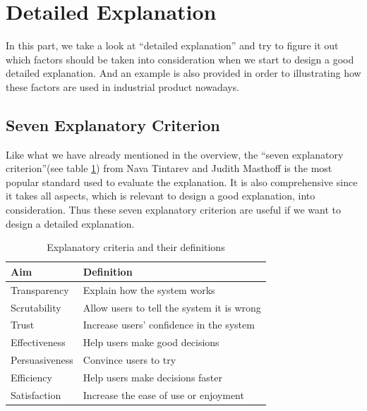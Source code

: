 \section{Detailed Explanation}
    In this part, we take a look at ``detailed explanation'' and try to figure it out which
    factors should be taken into consideration when we start to design a good detailed explanation.
    And an example is also provided in order to illustrating how these factors are used in industrial product nowadays.
    \subsection{Seven Explanatory Criterion}

        \indent 
        Like what we have already mentioned in the overview, the ``seven explanatory criterion''\cite{tintarev2007survey}(see table \ref{table:1}) from Nava Tintarev and Judith Masthoff
        is the most popular standard used to evaluate the explanation. 
        It is also comprehensive since it takes all aspects, which is relevant to design a good explanation, into consideration.
        Thus these seven explanatory criterion are useful if we want to design a detailed explanation.
        \begin{table}[ht] 
            \centering
            \begin{tabular}{ | m{8em} | m{4cm} | }
            \hline
            \bfseries Aim & \bfseries Definition\\ [0.5ex] 
            \hline\hline
            Transparency & Explain how the system works\\ 
            \hline
            Scrutability & Allow users to tell the system it is wrong\\ 
            \hline
            Trust & Increase users' confidence in the system\\ 
            \hline
            Effectiveness & Help users make good decisions\\ 
            \hline
            Persuasiveness & Convince users to try\\ 
            \hline
            Efficiency & Help users make decisions faster\\ 
            \hline
            Satisfaction & Increase the ease of use or enjoyment\\ 
            \hline
            \end{tabular}
            \caption{Explanatory criteria and their definitions}
            \label{table:1}
        \end{table}

